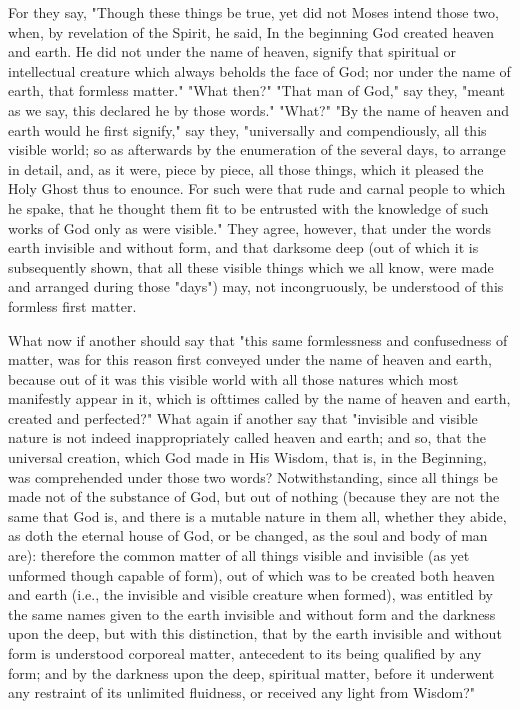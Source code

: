 \documentclass[b5paper,openright,12pt,twoside]{book}
\begin{document}
For they say, "Though these things be true, yet did not Moses intend
those two, when, by revelation of the Spirit, he said, In the beginning
God created heaven and earth. He did not under the name of heaven,
signify that spiritual or intellectual creature which always beholds the
face of God; nor under the name of earth, that formless matter." "What
then?" "That man of God," say they, "meant as we say, this declared he
by those words." "What?" "By the name of heaven and earth would he first
signify," say they, "universally and compendiously, all this visible
world; so as afterwards by the enumeration of the several days, to
arrange in detail, and, as it were, piece by piece, all those things,
which it pleased the Holy Ghost thus to enounce. For such were that
rude and carnal people to which he spake, that he thought them fit to be
entrusted with the knowledge of such works of God only as were visible."
They agree, however, that under the words earth invisible and without
form, and that darksome deep (out of which it is subsequently shown,
that all these visible things which we all know, were made and arranged
during those "days") may, not incongruously, be understood of this
formless first matter.

What now if another should say that "this same formlessness and
confusedness of matter, was for this reason first conveyed under the
name of heaven and earth, because out of it was this visible world with
all those natures which most manifestly appear in it, which is ofttimes
called by the name of heaven and earth, created and perfected?" What
again if another say that "invisible and visible nature is not indeed
inappropriately called heaven and earth; and so, that the universal
creation, which God made in His Wisdom, that is, in the Beginning, was
comprehended under those two words? Notwithstanding, since all things be
made not of the substance of God, but out of nothing (because they are
not the same that God is, and there is a mutable nature in them all,
whether they abide, as doth the eternal house of God, or be changed, as
the soul and body of man are): therefore the common matter of all things
visible and invisible (as yet unformed though capable of form), out of
which was to be created both heaven and earth (i.e., the invisible and
visible creature when formed), was entitled by the same names given to
the earth invisible and without form and the darkness upon the deep, but
with this distinction, that by the earth invisible and without form is
understood corporeal matter, antecedent to its being qualified by any
form; and by the darkness upon the deep, spiritual matter, before it
underwent any restraint of its unlimited fluidness, or received any
light from Wisdom?"
\end{document}
